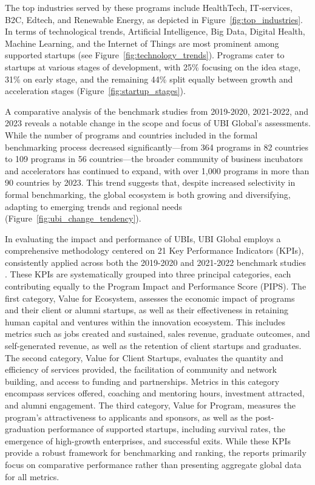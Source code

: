 \documentclass[../Main.tex]{subfiles}%
\begin{document}
	The top industries served by these programs include HealthTech, IT-services, B2C, Edtech, and Renewable Energy, as depicted in Figure~\ref{fig:top_industries}. In terms of technological trends, Artificial Intelligence, Big Data, Digital Health, Machine Learning, and the Internet of Things are most prominent among supported startups (see Figure~\ref{fig:technology_trends}). Programs cater to startups at various stages of development, with 25\% focusing on the idea stage, 31\% on early stage, and the remaining 44\% split equally between growth and acceleration stages (Figure~\ref{fig:startup_stages}).
	
	A comparative analysis of the benchmark studies from 2019-2020, 2021-2022, and 2023 reveals a notable change in the scope and focus of UBI Global's assessments. While the number of programs and countries included in the formal benchmarking process decreased significantly—from 364 programs in 82 countries to 109 programs in 56 countries—the broader community of business incubators and accelerators has continued to expand, with over 1,000 programs in more than 90 countries by 2023. This trend suggests that, despite increased selectivity in formal benchmarking, the global ecosystem is both growing and diversifying, adapting to emerging trends and regional needs (Figure~\ref{fig:ubi_change_tendency}).
	
	In evaluating the impact and performance of UBIs, UBI Global employs a comprehensive methodology centered on 21 Key Performance Indicators (KPIs), consistently applied across both the 2019-2020 and 2021-2022 benchmark studies \autocite{ubi2019world, ubi2021world}. These KPIs are systematically grouped into three principal categories, each contributing equally to the Program Impact and Performance Score (PIPS). The first category, Value for Ecosystem, assesses the economic impact of programs and their client or alumni startups, as well as their effectiveness in retaining human capital and ventures within the innovation ecosystem. This includes metrics such as jobs created and sustained, sales revenue, graduate outcomes, and self-generated revenue, as well as the retention of client startups and graduates. The second category, Value for Client Startups, evaluates the quantity and efficiency of services provided, the facilitation of community and network building, and access to funding and partnerships. Metrics in this category encompass services offered, coaching and mentoring hours, investment attracted, and alumni engagement. The third category, Value for Program, measures the program's attractiveness to applicants and sponsors, as well as the post-graduation performance of supported startups, including survival rates, the emergence of high-growth enterprises, and successful exits. While these KPIs provide a robust framework for benchmarking and ranking, the reports primarily focus on comparative performance rather than presenting aggregate global data for all metrics.
	
\end{document}
